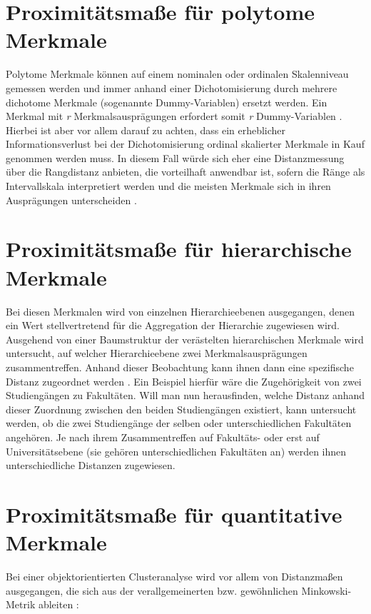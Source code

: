\section{Proximitätsmaße für polytome Merkmale}
Polytome Merkmale können auf einem nominalen oder ordinalen Skalenniveau gemessen werden und immer anhand einer Dichotomisierung durch mehrere dichotome Merkmale (sogenannte Dummy-Variablen) ersetzt werden. Ein Merkmal mit \textit{r} Merkmalsausprägungen erfordert somit \textit{r} Dummy-Variablen \citep[Vgl.][S. 159]{Bankhofer.2008}. Hierbei ist aber vor allem darauf zu achten, dass ein erheblicher Informationsverlust bei der Dichotomisierung ordinal skalierter Merkmale in Kauf genommen werden muss. In diesem Fall würde sich eher eine Distanzmessung über die Rangdistanz anbieten, die vorteilhaft anwendbar ist, sofern die Ränge als Intervallskala interpretiert werden und die meisten Merkmale sich in ihren Ausprägungen unterscheiden \citep[Vgl.][S. 225]{Eckey.2002}.

\section{Proximitätsmaße für hierarchische Merkmale}
Bei diesen Merkmalen wird von einzelnen Hierarchieebenen ausgegangen, denen ein Wert stellvertretend für die Aggregation der Hierarchie zugewiesen wird. Ausgehend von einer Baumstruktur der verästelten hierarchischen Merkmale wird untersucht, auf welcher Hierarchieebene zwei Merkmalsausprägungen zusammentreffen. Anhand dieser Beobachtung kann ihnen dann eine spezifische Distanz zugeordnet werden \citep[Vgl.][S. 160]{Bankhofer.2008}. Ein Beispiel hierfür wäre die Zugehörigkeit von zwei Studiengängen zu Fakultäten. Will man nun herausfinden, welche Distanz anhand dieser Zuordnung zwischen den beiden Studiengängen existiert, kann untersucht werden, ob die zwei Studiengänge der selben oder unterschiedlichen Fakultäten angehören. Je nach ihrem Zusammentreffen auf Fakultäts- oder erst auf Universitätsebene (sie gehören unterschiedlichen Fakultäten an) werden ihnen unterschiedliche Distanzen zugewiesen.

\section{Proximitätsmaße für quantitative Merkmale}
Bei einer objektorientierten Clusteranalyse wird vor allem von Distanzmaßen ausgegangen, die sich aus der verallgemeinerten bzw. gewöhnlichen Minkowski-Metrik ableiten \citep[Vgl.][S. 219]{Bacher.2010}:

